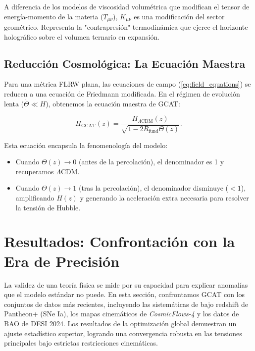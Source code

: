 \documentclass[12pt, a4paper]{article}
\theoremstyle{plain}
\theoremstyle{definition}
\begin{document}
A diferencia de los modelos de viscosidad volumétrica que modifican el tensor de energía-momento de la materia ($T_{\mu\nu}$), $K_{\mu\nu}$ es una modificación del sector geométrico. Representa la "contrapresión" termodinámica que ejerce el horizonte holográfico sobre el volumen ternario en expansión.

\subsection{Reducción Cosmológica: La Ecuación Maestra}

Para una métrica FLRW plana, las ecuaciones de campo (\ref{eq:field_equations}) se reducen a una ecuación de Friedmann modificada. En el régimen de evolución lenta ($\dot{\Theta} \ll H$), obtenemos la ecuación maestra de GCAT:

\begin{equation}
H_{\text{GCAT}}(z) = \frac{H_{\Lambda\text{CDM}}(z)}{\sqrt{1 - 2 R_{\text{fund}} \Theta(z)}}.
\label{eq:master_equation}
\end{equation}

Esta ecuación encapsula la fenomenología del modelo:
\begin{itemize}
    \item Cuando $\Theta(z) \to 0$ (antes de la percolación), el denominador es 1 y recuperamos $\Lambda$CDM.
    \item Cuando $\Theta(z) \to 1$ (tras la percolación), el denominador disminuye ($<1$), amplificando $H(z)$ y generando la aceleración extra necesaria para resolver la tensión de Hubble.
\end{itemize}

\section{Resultados: Confrontación con la Era de Precisión}
\label{sec:resultados}

La validez de una teoría física se mide por su capacidad para explicar anomalías que el modelo estándar no puede. En esta sección, confrontamos GCAT con los conjuntos de datos más recientes, incluyendo las sistemáticas de bajo redshift de Pantheon+ (SNe Ia), los mapas cinemáticos de \textit{CosmicFlows-4} y los datos de BAO de DESI 2024. Los resultados de la optimización global demuestran un ajuste estadístico superior, logrando una convergencia robusta en las tensiones principales bajo estrictas restricciones cinemáticas.
\end{document}
